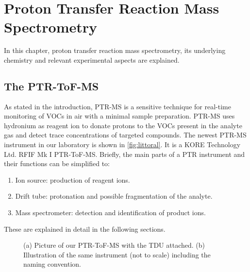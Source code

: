 \chapter{Proton Transfer Reaction Mass Spectrometry}\label{chapter:ptr}

In this chapter, proton transfer reaction mass spectrometry, %
 its underlying chemistry and relevant experimental aspects
are explained.





\section{The PTR-ToF-MS}
As stated in the introduction, PTR-MS is a sensitive technique for real-time monitoring of VOCs in air with a minimal sample preparation. PTR-MS uses hydronium as reagent ion to donate protons to the VOCs present in the analyte gas and detect trace concentrations of targeted compounds.  The newest PTR-MS instrument in our laboratory is shown in \autoref{fig:littoral}. It is a KORE Technology Ltd. RFIF Mk I PTR-ToF-MS.
Briefly, the main  parts of a PTR instrument and their functions can be simplified to:
\begin{enumerate}
    \item Ion source: production of reagent ions.
    \item Drift tube: protonation and possible fragmentation of the analyte.
    \item Mass spectrometer: detection and identification of product ions.
\end{enumerate}
  These are explained in detail in the following sections.

\begin{figure}%
\centering
{}

\bigskip
{}
\caption{(a) Picture of our  PTR-ToF-MS  with the TDU attached.  (b) Illustration of the same instrument (not to scale) including the naming convention.}
\label{fig:littoral}
\end{figure}




